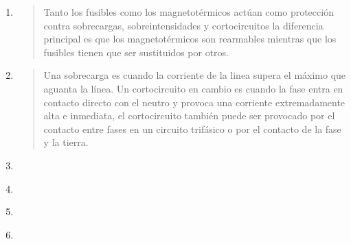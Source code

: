 \documentclass[spanish,openany]{report}
\begin{document}
\begin{enumerate}
  \item {}

  \begin{quote}
	  Tanto los fusibles como los magnetotérmicos actúan como protección contra sobrecargas, sobreintensidades y cortocircuitos
	  la diferencia principal es que los magnetotérmicos son 
	  rearmables mientras que los fusibles tienen que ser sustituidos por otros.
  \end{quote}
\clearpage
  \item {}

  \begin{quote}
	  Una sobrecarga es cuando la corriente de la linea supera el máximo que aguanta la línea. Un cortocircuito en cambio es cuando la fase entra
	  en contacto directo con el neutro y provoca una corriente extremadamente alta e inmediata, el cortocircuito también puede ser provocado por
	  el contacto entre fases en un circuito trifásico o por el contacto de la fase y la tierra.
  \end{quote}

  \item {}

  \begin{quote}
  \end{quote}

  \item {}

  \begin{quote}
  \end{quote}

  \item {}

  \begin{quote}
  \end{quote}

  \item {}

  \begin{quote}
  \end{quote}


\end{enumerate}
\end{document}
